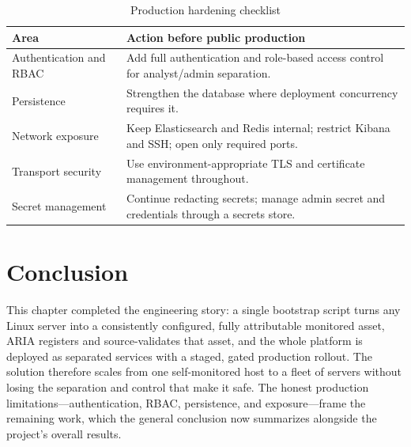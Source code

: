 \begin{table}[H]
\centering
\caption{Production hardening checklist}
\begin{tabularx}{\textwidth}{@{}p{}Y@{}}
\toprule
\textbf{Area} & \textbf{Action before public production} \\
\midrule
Authentication and RBAC & Add full authentication and role-based access control for analyst/admin separation. \\
Persistence & Strengthen the database where deployment concurrency requires it. \\
Network exposure & Keep Elasticsearch and Redis internal; restrict Kibana and SSH; open only required ports. \\
Transport security & Use environment-appropriate TLS and certificate management throughout. \\
Secret management & Continue redacting secrets; manage admin secret and credentials through a secrets store. \\
\bottomrule
\end{tabularx}
\end{table}

\section{Conclusion}

This chapter completed the engineering story: a single bootstrap script turns any Linux server into a consistently configured, fully attributable monitored asset, ARIA registers and source-validates that asset, and the whole platform is deployed as separated services with a staged, gated production rollout. The solution therefore scales from one self-monitored host to a fleet of servers without losing the separation and control that make it safe. The honest production limitations---authentication, RBAC, persistence, and exposure---frame the remaining work, which the general conclusion now summarizes alongside the project's overall results.
